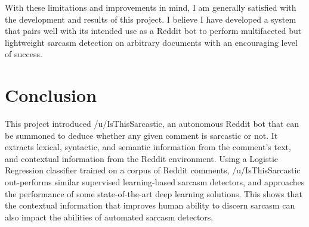 \documentclass[a4paper,12pt]{article}
\begin{document}
With these limitations and improvements in mind, I am generally satisfied with the development and results of this project. I believe I have developed a system that pairs well with its intended use as a Reddit bot to perform multifaceted but lightweight sarcasm detection on arbitrary documents with an encouraging level of success.

\section{Conclusion}
This project introduced /u/IsThisSarcastic, an autonomous Reddit bot that can be summoned to deduce whether any given comment is sarcastic or not. It extracts lexical, syntactic, and semantic information from the comment's text, and contextual information from the Reddit environment. Using a Logistic Regression classifier trained on a corpus of Reddit comments, /u/IsThisSarcastic out-performs similar supervised learning-based sarcasm detectors, and approaches the performance of some state-of-the-art deep learning solutions. This shows that the contextual information that improves human ability to discern sarcasm can also impact the abilities of automated sarcasm detectors.
\clearpage

\begin{footnotesize}


\end{footnotesize}

\newpage
{}
\renewcommand*{\thepage}{A\arabic{page}}
\appendix
\end{document}
